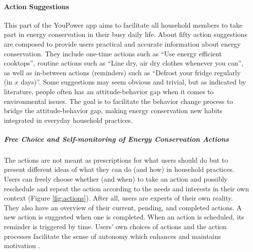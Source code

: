 \paragraph{Action Suggestions}

This part of the YouPower app aims to %
facilitate all household members to take part in energy conservation in their busy daily life. 
% 
About fifty action suggestions are composed to provide users practical and accurate information about energy conservation. 
They include one-time actions such as ``Use energy efficient cooktops'', routine actions such as ``Line dry, air dry clothes whenever you can'', as well as in-between actions (reminders) such as ``Defrost your fridge regularly (in $x$ days)''. 
Some suggestions may seem obvious and trivial, but as indicated by literature, people often has an attitude-behavior gap when it comes to environmental issues. The goal is to facilitate the behavior change process to bridge the attitude-behavior gap, making energy conservation new habits integrated in everyday household practices. 

\subparagraph{Free Choice and Self-monitoring of Energy Conservation Actions}

The actions are not meant as prescriptions for what users should do but to present different ideas of what they can do (and how) in household practices. 
Users can freely choose whether (and when) to take an action and possibly reschedule and repeat the action according to the needs and interests in their own context (Figure \ref{fig:actions}). After all, users are experts of their own reality. They also have an overview of their current, pending, and completed actions.
A new action is suggested when one is completed. %
When an action is scheduled, its reminder is triggered by time. Users' own choices of actions and the action processes facilitate the sense of autonomy which enhances and maintains motivation \cite{Ryan2000}.


